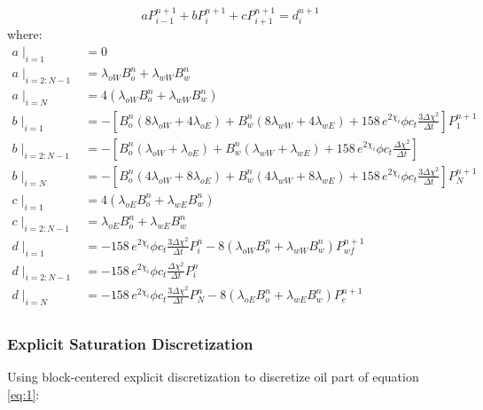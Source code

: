 \documentclass[12pt,letterpaper,titlepage]{article}
\begin{document}
\begin{equation}
\label{abcd}
a P^{n+1}_{i-1}+b P^{n+1}_{i}+c P^{n+1}_{i+1} =d^{n+1}_i
\end{equation}
where: 
\begin{align*}
a\mid_{i=1}&=0\\
a\mid_{i=2:N-1} &=\lambda_{oW}B_o^n+\lambda_{wW}B_w^n\\
a\mid_{i=N} &=4(\lambda_{oW}B_o^n+\lambda_{wW}B_w^n)\\
b\mid_{i=1}&=-\left[B_o^n(8\lambda_{oW}+4\lambda_{oE})+B_w^n(8\lambda_{wW}+4\lambda_{wE})+158\,e^{2\chi_i}\phi c_t \frac{3\Delta\chi^2}{\Delta t}\right]P_1^{n+1}\\
b\mid_{i=2:N-1} &=-\left[B_o^n(\lambda_{oW}+\lambda_{oE})+B_w^n(\lambda_{wW}+\lambda_{wE})+158\,e^{2\chi_i}\phi c_t \frac{\Delta\chi^2}{\Delta t}\right]\\
b\mid_{i=N} &=-\left[B_o^n(4\lambda_{oW}+8\lambda_{oE})+B_w^n(4\lambda_{wW}+8\lambda_{wE})+158\,e^{2\chi_i}\phi c_t \frac{3\Delta\chi^2}{\Delta t}\right]P_N^{n+1}\\
c\mid_{i=1}&=4(\lambda_{oE}B_o^n+\lambda_{wE}B_w^n)\\
c\mid_{i=2:N-1} &=\lambda_{oE}B_o^n+\lambda_{wE}B_w^n\\
d\mid_{i=1}&=-158\,e^{2\chi_i}\phi c_t \frac{3\Delta\chi^2}{\Delta t}P_i^n-8(\lambda_{oW}B_o^n+\lambda_{wW}B_w^n)P_{wf}^{n+1}\\
d\mid_{i=2:N-1} &=-158\,e^{2\chi_i}\phi c_t \frac{\Delta\chi^2}{\Delta t}P_i^n\\
d\mid_{i=N} &=-158\,e^{2\chi_i}\phi c_t \frac{3\Delta\chi^2}{\Delta t}P_N^n- 8(\lambda_{oE}B_o^n+\lambda_{wE}B_w^n)P_{e}^{n+1}\\
\end{align*}

\subsubsection{Explicit Saturation Discretization}
Using block-centered explicit discretization to discretize oil part of equation \ref{eq:1}:
\end{document}
